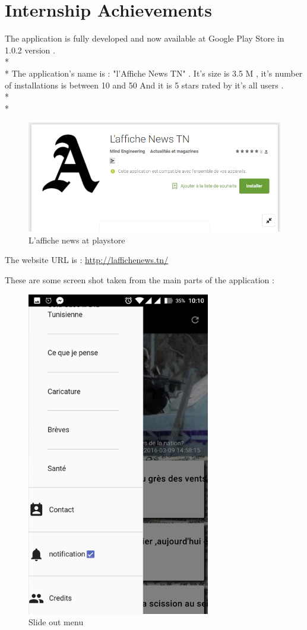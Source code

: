 \chapter{Internship Achievements}

The application is fully developed and  now available at Google Play Store in 1.0.2 version .
\\*
\\* 
The application's name is : "l'Affiche News TN" . It's size is 3.5 M , it's number of installations is between 10 and 50 And it is 5 stars rated by it's all users .
\\*
\\*
\begin{figure}[H]
	\includegraphics[width=13cm]{play.png}
	\caption{L'affiche news at playstore}
	\label{play}
\centering
\end{figure}
The website URL is : \url{http://laffichenews.tn/}

These are some screen shot taken from the main parts of the application :

\begin{figure}[H]
\centering
	\includegraphics[width=8cm]{screenshot1.png}
	\caption{Slide out menu}
	\label{screenshot}

\end{figure}

